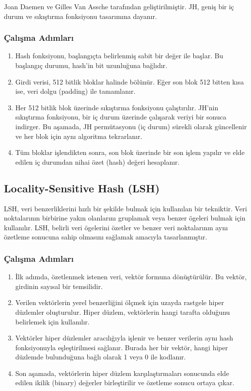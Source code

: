 Joan Daemen ve Gilles Van Assche tarafından geliştirilmiştir. JH, geniş bir iç durum ve sıkıştırma fonksiyonu tasarımına dayanır.

\subsubsection{Çalışma Adımları}

\begin{enumerate}
    \item Hash fonksiyonu, başlangıçta belirlenmiş sabit bir değer ile başlar. Bu başlangıç durumu, hash’in bit uzunluğuna bağlıdır.
    \item Girdi verisi, 512 bitlik bloklar halinde bölünür. Eğer son blok 512 bitten kısa ise, veri dolgu (padding) ile tamamlanır.
    \item Her 512 bitlik blok üzerinde sıkıştırma fonksiyonu çalıştırılır. JH'nin sıkıştırma fonksiyonu, bir iç durum üzerinde çalışarak veriyi bir sonuca indirger. Bu aşamada, JH permütasyonu (iç durum) sürekli olarak güncellenir ve her blok için aynı algoritma tekrarlanır.
    \item Tüm bloklar işlendikten sonra, son blok üzerinde bir son işlem yapılır ve elde edilen iç durumdan nihai özet (hash) değeri hesaplanır.
\end{enumerate}

\newpage

\subsection{Locality-Sensitive Hash (LSH)}

LSH, veri benzerliklerini hızlı bir şekilde bulmak için kullanılan bir tekniktir. Veri noktalarının birbirine yakın olanlarını gruplamak veya benzer ögeleri bulmak için kullanılır. LSH, belirli veri ögelerini özetler ve benzer veri noktalarının aynı özetleme sonucuna sahip olmasını sağlamak amacıyla tasarlanmıştır.

\subsubsection{Çalışma Adımları}

\begin{enumerate}
    \item İlk adımda, özetlenmek istenen veri, vektör formuna dönüştürülür. Bu vektör, girdinin sayısal bir temsilidir.
    \item Verilen vektörlerin yerel benzerliğini ölçmek için uzayda rastgele hiper düzlemler oluşturulur. Hiper düzlem, vektörlerin hangi tarafta olduğunu belirlemek için kullanılır.
    \item Vektörler hiper düzlemler aracılığıyla işlenir ve benzer verilerin aynı hash fonksiyonuyla eşleştirilmesi sağlanır. Burada her bir vektör, hangi hiper düzlemde bulunduğuna bağlı olarak 1 veya 0 ile kodlanır.
    \item Son aşamada, vektörlerin hiper düzlem karşılaştırmaları sonucunda elde edilen ikilik (binary) değerler birleştirilir ve özetleme sonucu ortaya çıkar.
\end{enumerate}

